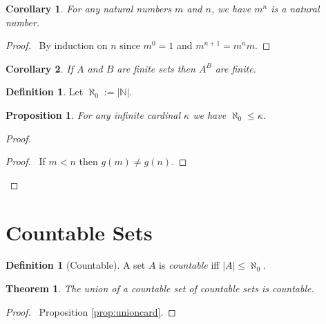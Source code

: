 \documentclass{book}
\let\qed\relax
\newtheorem{prop}[ax]{Proposition}
\newtheorem{cor}{Corollary}[ax]
\newtheorem{thm}[ax]{Theorem}
\theoremstyle{definition}
\newtheorem{df}[ax]{Definition}
\begin{document}
\begin{cor}
For any natural numbers $m$ and $n$, we have $m^n$ is a natural number.
\end{cor}

\begin{proof}
\pf\ By induction on $n$ since $m^0 = 1$ and $m^{n+1} = m^n m$. \qed
\end{proof}

\begin{cor}
If $A$ and $B$ are finite sets then $A^B$ are finite.
\end{cor}

\begin{df}
Let $\aleph_0 := |\mathbb{N}|$.
\end{df}

\begin{prop}
For any infinite cardinal $\kappa$ we have $\aleph_0 \leq \kappa$.
\end{prop}

\begin{proof}
\pf
{}
\begin{proof}
	\pf\ If $m < n$ then $g(m) \neq g(n)$.
\end{proof}
\qed
\end{proof}


\section{Countable Sets}

\begin{df}[Countable]
A set $A$ is \emph{countable} iff $|A| \leq \aleph_0$.
\end{df}

\begin{thm}
The union of a countable set of countable sets is countable.
\end{thm}

\begin{proof}
\pf\ Proposition \ref{prop:unioncard}. \qed
\end{proof}
\end{document}
